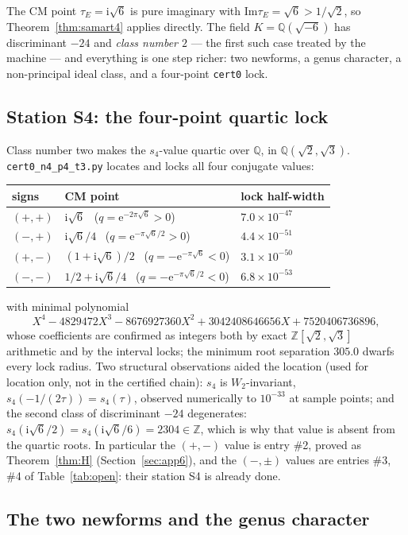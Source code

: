 \documentclass[11pt]{article}
\newcommand{\Qq}{\mathbb{Q}}
\newcommand{\Zz}{\mathbb{Z}}
\newcommand{\ii}{\mathrm{i}}
\newcommand{\e}{\mathrm{e}}
\newcommand{\ImT}{\mathrm{Im}}
\theoremstyle{definition}
\theoremstyle{remark}
\begin{document}
The CM point $\tau_E=\ii\sqrt6$ is pure imaginary with
$\ImT\tau_E=\sqrt6>1/\sqrt2$, so Theorem~\ref{thm:samart4} applies
directly. The field $K=\Qq(\sqrt{-6})$ has discriminant $-24$ and
\emph{class number $2$} --- the first such case treated by the
machine --- and everything is one step richer: two newforms, a genus
character, a non-principal ideal class, and a four-point
\texttt{cert0} lock.

\subsection{Station S4: the four-point quartic lock}

Class number two makes the $s_4$-value quartic over $\Qq$, in
$\Qq(\sqrt2,\sqrt3)$. \texttt{cert0\_n4\_p4\_t3.py} locates and
locks all four conjugate values:
\begin{center}
\begin{tabular}{lll}
\toprule
signs & CM point & lock half-width\\
\midrule
$(+,+)$ & $\ii\sqrt6$ \ ($q=\e^{-2\pi\sqrt6}>0$) & $7.0\times10^{-47}$\\
$(-,+)$ & $\ii\sqrt6/4$ \ ($q=\e^{-\pi\sqrt6/2}>0$) & $4.4\times10^{-51}$\\
$(+,-)$ & $(1+\ii\sqrt6)/2$ \ ($q=-\e^{-\pi\sqrt6}<0$) & $3.1\times10^{-50}$\\
$(-,-)$ & $1/2+\ii\sqrt6/4$ \ ($q=-\e^{-\pi\sqrt6/2}<0$) & $6.8\times10^{-53}$\\
\bottomrule
\end{tabular}
\end{center}
with minimal polynomial
\[
  X^4-4829472X^3-8676927360X^2+3042408646656X+7520406736896,
\]
whose coefficients are confirmed as integers both by exact
$\Zz[\sqrt2,\sqrt3]$ arithmetic and by the interval locks; the
minimum root separation $305.0$ dwarfs every lock radius. Two
structural observations aided the location (used for location only,
not in the certified chain): $s_4$ is $W_2$-invariant,
$s_4(-1/(2\tau))=s_4(\tau)$, observed numerically to $10^{-33}$ at
sample points; and the second class of discriminant $-24$ degenerates:
$s_4(\ii\sqrt6/2)=s_4(\ii\sqrt6/6)=2304\in\Zz$, which is why that
value is absent from the quartic roots. In particular the $(+,-)$
value is entry \#2, proved as Theorem~\ref{thm:H}
(Section~\ref{sec:app6}), and the $(-,\pm)$
values are entries \#3, \#4 of Table~\ref{tab:open}: their station
S4 is already done.

\subsection{The two newforms and the genus character}\label{subsec:genus}
\end{document}
